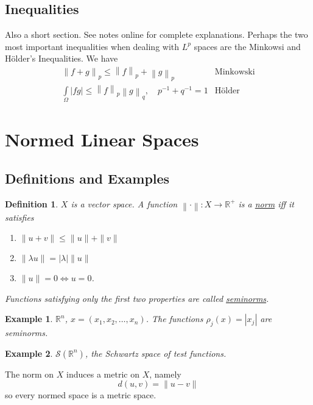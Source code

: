 \documentclass[letterpaper,twoside,11pt]{article}
\theoremstyle{mystyle}
\newtheorem{definition}{Definition}[section]
\newtheorem*{ex}{Example}
\newcommand{\R}{{\mathbb R}}
\begin{document}
\subsection{Inequalities}
Also a short section. See notes online for complete explanations. 
Perhaps the two most important inequalities when dealing with $L^p$ spaces are the Minkowsi and H{\"o}lder's Inequalities. We have 
\[\begin{array}{*{20}{c}}
  {{{\left\| {f + g} \right\|}_p} \leq {{\left\| f \right\|}_p} + {{\left\| g \right\|}_p}}&{\text{Minkowski}} \\[.25cm] 
  {\displaystyle\int\limits_\Omega  {\left| {fg} \right|}  \leq {{\left\| f \right\|}_p}{{\left\| g \right\|}_q},\quad {p^{ - 1}} + {q^{ - 1}} = 1}&{\text{H\"older}} 
\end{array}\]

\section{Normed Linear Spaces}

\subsection{Definitions and Examples}
\begin{definition}
  $X$ is a vector space. A function $\left\|  \cdot  \right\|:X \to {\mathbb{R}^ + }$ is a \underline{norm} iff it satisfies 
\begin{enumerate}
  \item $\|u+v\|\leq \|u\| + \|v\|$
  \item $\|\lambda u\| = |\lambda |\|u\|$
  \item $\|u\| = 0 \Leftrightarrow u = 0$. 
\end{enumerate}
Functions satisfying only the first two properties are called \underline{seminorms}. 
\end{definition}
\begin{ex}
  $\R^n$, $x = (x_1, x_2, \dots, x_n)$. The functions $\rho_j(x) = |x_j|$ are seminorms. 
\end{ex}
\begin{ex}
  $\mathcal S(\R^n)$, the Schwartz space of test functions. 
\end{ex}
The norm on $X$ induces a metric on $X$, namely 
\[d(u,v)=\|u-v\|\]
so every normed space is a metric space. 
\end{document}
